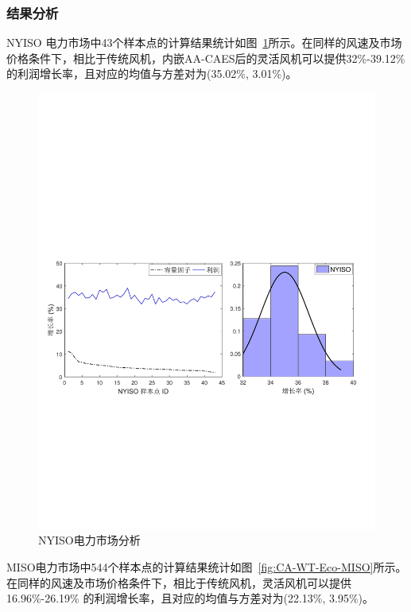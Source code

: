 \subsubsection{结果分析}
NYISO 电力市场中43个样本点的计算结果统计如图~\ref{fig:CA-WT-Eco-NYISO}所示。在同样的风速及市场价格条件下，相比于传统风机，内嵌AA-CAES后的灵活风机可以提供32\%-39.12\% 的利润增长率，且对应的均值与方差对为(35.02\%, 3.01\%)。

\begin{figure}[H] %
  \centering
  \includegraphics[scale=0.70]{figures/Chap5-16-CA-WT-Eco-NYISO.pdf}
  \caption{NYISO电力市场分析}
  \label{fig:CA-WT-Eco-NYISO}
\end{figure}

MISO电力市场中544个样本点的计算结果统计如图~\ref{fig:CA-WT-Eco-MISO}所示。在同样的风速及市场价格条件下，相比于传统风机，灵活风机可以提供 16.96\%-26.19\% 的利润增长率，且对应的均值与方差对为(22.13\%, 3.95\%)。

